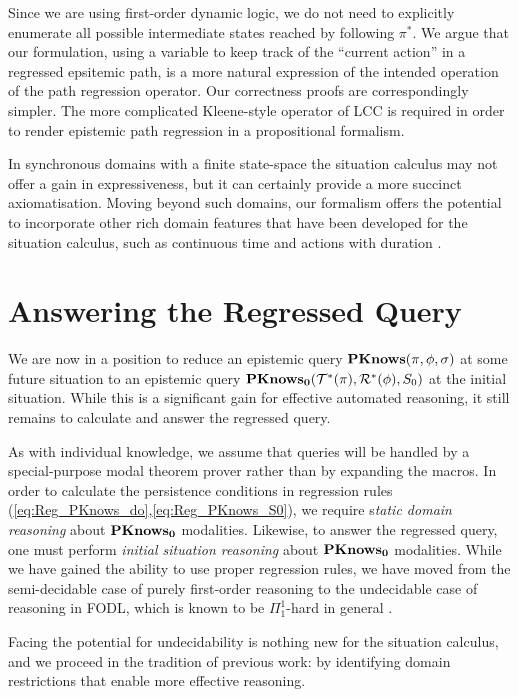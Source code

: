 Since we are using first-order dynamic logic, we do not need to explicitly
enumerate all possible intermediate states reached by following $\pi^{*}$.
We argue that our formulation, using a variable to keep track of the
{}``current action'' in a regressed epsitemic path, is a more natural
expression of the intended operation of the path regression operator.
Our correctness proofs are correspondingly simpler. The more complicated
Kleene-style operator of LCC is required in order to render epistemic
path regression in a propositional formalism.

In synchronous domains with a finite state-space the situation calculus
may not offer a gain in expressiveness, but it can certainly provide
a more succinct axiomatisation. Moving beyond such domains, our formalism
offers the potential to incorporate other rich domain features that
have been developed for the situation calculus, such as continuous
time and actions with duration \citep{reiter96sc_nat_conc}.


\section{Answering the Regressed Query\label{sec:CKnowledge:Reasoning}}

We are now in a position to reduce an epistemic query $\mathbf{PKnows}(\pi,\phi,\sigma)$
at some future situation to an epistemic query $\mathbf{PKnows_{0}}(\mathcal{T}^{*}(\pi),\mathcal{R}^{*}(\phi),S_{0})$
at the initial situation. While this is a significant gain for effective
automated reasoning, it still remains to calculate and answer the
regressed query.

As with individual knowledge, we assume that queries will be handled
by a special-purpose modal theorem prover rather than by expanding
the macros. In order to calculate the persistence conditions in regression
rules (\ref{eq:Reg_PKnows_do},\ref{eq:Reg_PKnows_S0}), we require
s\emph{tatic domain reasoning} about $\mathbf{PKnows_{0}}$ modalities. Likewise,
to answer the regressed query, one must perform \emph{initial situation
reasoning} about $\mathbf{PKnows_{0}}$ modalities. While we have gained the
ability to use proper regression rules, we have moved from the semi-decidable
case of purely first-order reasoning to the undecidable case of reasoning
in FODL, which is known to be $\Pi_{1}^{1}$-hard in general \citep{kooi07dyn_termmodal_logic}.

Facing the potential for undecidability is nothing new for the situation
calculus, and we proceed in the tradition of previous work: by identifying
domain restrictions that enable more effective reasoning.\\


